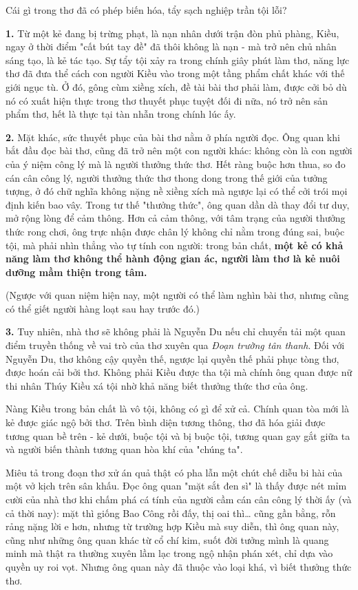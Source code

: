 \documentclass[../main.tex]{subfiles}
\begin{document}
\begin{multicols}{2}
Cái gì trong thơ đã có phép biến hóa, tẩy sạch nghiệp trần tội lỗi? 
 
\textbf{1.} Từ một kẻ đang bị trừng phạt, là nạn nhân dưới trận đòn phủ phàng, Kiều, ngay ở thời điểm "cất bút tay đề" đã thôi không là nạn - mà trở nên chủ nhân sáng tạo, là kẻ tác tạo. Sự tẩy tội xảy ra trong chính giây phút làm thơ, năng lực thơ đã đưa thể cách con người Kiều vào trong một tầng phẩm chất khác với thế giới ngục tù. Ở đó, gông cùm xiềng xích, đề tài bài thơ phải làm, được cởi bỏ dù nó có xuất hiện thực trong thơ thuyết phục tuyệt đối đi nữa, nó trở nên sản phẩm thơ, hết là thực tại tàn nhẫn trong chính lúc ấy. 
 
\textbf{2.} Mặt khác, sức thuyết phục của bài thơ nằm ở phía người đọc. Ông quan khi bắt đầu đọc bài thơ, cũng đã trở nên một con người khác: không còn là con người của ý niệm công lý mà là người thưởng thức thơ. Hết ràng buộc hơn thua, so đo cán cân công lý, người thưởng thức thơ thong dong trong thế giới của tưởng tượng, ở đó chữ nghĩa không nặng nề xiềng xích mà ngược lại có thể cởi trói mọi định kiến bao vây. Trong tư thế "thưởng thức", ông quan dần dà thay đổi tư duy, mở rộng lòng để cảm thông. Hơn cả cảm thông, với tâm trạng của người thưởng thức rong chơi, ông trực nhận được chân lý không chỉ nằm trong đúng sai, buộc tội, mà phải nhìn thẳng vào tự tính con người: trong bản chất, \textbf{một kẻ có khả năng làm thơ không thể hành động gian ác, người làm thơ là kẻ nuôi dưỡng mầm thiện trong tâm.} 
 
(Ngược với quan niệm hiện nay, một người có thể làm nghìn bài thơ, nhưng cũng có thể giết người hàng loạt sau hay trước đó.) 
 
\textbf{3.} Tuy nhiên, nhà thơ sẽ không phải là Nguyễn Du nếu chỉ chuyển tải một quan điểm truyền thống về vai trò của thơ xuyên qua \textit{Đoạn trường tân thanh}. Đối với Nguyễn Du, thơ không cậy quyền thế, ngược lại quyền thế phải phục tòng thơ, được hoán cải bởi thơ. Không phải Kiều được tha tội mà chính ông quan được nữ thi nhân Thúy Kiều xá tội nhờ khả năng biết thưởng thức thơ của ông.  
 
Nàng Kiều trong bản chất là vô tội, không có gì để xử cả. Chính quan tòa mới là kẻ được giác ngộ bởi thơ. Trên bình diện tương thông, thơ đã hóa giải được tương quan bề trên - kẻ dưới, buộc tội và bị buộc tội, tương quan gay gắt giữa ta và người biến thành tương quan hòa khí của "chúng ta". 
 
Miêu tả trong đoạn thơ xử án quả thật có pha lẫn một chút chế diễu bi hài của một vở kịch trên sân khấu. Đọc ông quan "mặt sắt đen sì" là thấy được nét mỉm cười của nhà thơ khi chấm phá cá tính của người cầm cán cân công lý thời ấy (và cả thời nay): mặt thì giống Bao Công rồi đấy, thị oai thì… cũng gần bằng, rỗn rảng nặng lời e hơn, nhưng từ trường hợp Kiều mà suy diễn, thì ông quan này, cũng như những ông quan khác từ cổ chí kim, suốt đời tưởng mình là quang minh mà thật ra thường xuyên lầm lạc trong ngộ nhận phán xét, chỉ dựa vào quyền uy roi vọt. Nhưng ông quan này đã thuộc vào loại khá, vì biết thưởng thức thơ. 
 

\end{multicols}
\end{document}

